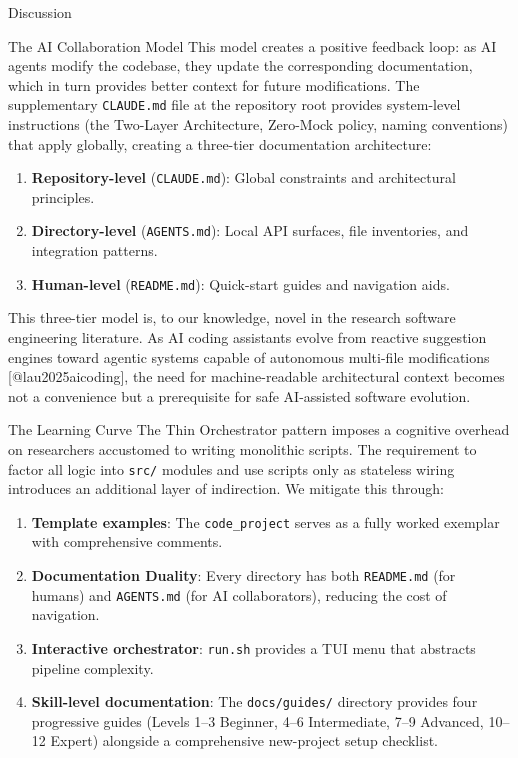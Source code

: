 \documentclass[
  ignorenonframetext,
]{beamer}
\providecommand{\tightlist}{%
  \setlength{\itemsep}{0pt}\setlength{\parskip}{0pt}}
\begin{document}
\begin{frame}[fragile]{Discussion}
\begin{block}{The AI Collaboration Model}
This model creates a positive feedback loop: as AI agents modify the
codebase, they update the corresponding documentation, which in turn
provides better context for future modifications. The supplementary
\texttt{CLAUDE.md} file at the repository root provides system-level
instructions (the Two-Layer Architecture, Zero-Mock policy, naming
conventions) that apply globally, creating a three-tier documentation
architecture:

\begin{enumerate}
\tightlist
\item
  \textbf{Repository-level} (\texttt{CLAUDE.md}): Global constraints and
  architectural principles.
\item
  \textbf{Directory-level} (\texttt{AGENTS.md}): Local API surfaces,
  file inventories, and integration patterns.
\item
  \textbf{Human-level} (\texttt{README.md}): Quick-start guides and
  navigation aids.
\end{enumerate}

This three-tier model is, to our knowledge, novel in the research
software engineering literature. As AI coding assistants evolve from
reactive suggestion engines toward agentic systems capable of autonomous
multi-file modifications {[}@lau2025aicoding{]}, the need for
machine-readable architectural context becomes not a convenience but a
prerequisite for safe AI-assisted software evolution.
\end{block}

\begin{block}{The Learning Curve}
\protect{}\label{the-learning-curve}
The Thin Orchestrator pattern imposes a cognitive overhead on
researchers accustomed to writing monolithic scripts. The requirement to
factor all logic into \texttt{src/} modules and use scripts only as
stateless wiring introduces an additional layer of indirection. We
mitigate this through:

\begin{enumerate}
\tightlist
\item
  \textbf{Template examples}: The \texttt{code\_project} serves as a
  fully worked exemplar with comprehensive comments.
\item
  \textbf{Documentation Duality}: Every directory has both
  \texttt{README.md} (for humans) and \texttt{AGENTS.md} (for AI
  collaborators), reducing the cost of navigation.
\item
  \textbf{Interactive orchestrator}: \texttt{run.sh} provides a TUI menu
  that abstracts pipeline complexity.
\item
  \textbf{Skill-level documentation}: The \texttt{docs/guides/}
  directory provides four progressive guides (Levels 1--3 Beginner, 4--6
  Intermediate, 7--9 Advanced, 10--12 Expert) alongside a comprehensive
  new-project setup checklist.
\end{enumerate}
\end{block}


\end{frame}
\end{document}

